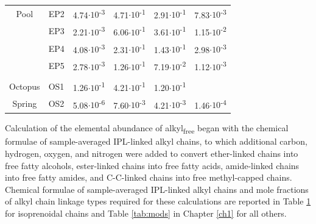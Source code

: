 {\begin{table}
\begin{threeparttable}
\begin{tabular}{clllcc}
Pool  & EP2   & 4.74$\cdot 10$\textsuperscript{-3} & 4.71$\cdot 10$\textsuperscript{-1} & 2.91$\cdot 10$\textsuperscript{-1} & 7.83$\cdot 10$\textsuperscript{-3} \\
      & EP3   & 2.21$\cdot 10$\textsuperscript{-3} & 6.06$\cdot 10$\textsuperscript{-1} & 3.61$\cdot 10$\textsuperscript{-1} & 1.15$\cdot 10$\textsuperscript{-2} \\
      & EP4   & 4.08$\cdot 10$\textsuperscript{-3} & 2.31$\cdot 10$\textsuperscript{-1} & 1.43$\cdot 10$\textsuperscript{-1} & 2.98$\cdot 10$\textsuperscript{-3} \\
      & EP5   & 2.78$\cdot 10$\textsuperscript{-3} & 1.26$\cdot 10$\textsuperscript{-1} & 7.19$\cdot 10$\textsuperscript{-2} & 1.12$\cdot 10$\textsuperscript{-3} \\
      &       &       &       &       &  \\
Octopus & OS1   & 1.26$\cdot 10$\textsuperscript{-1} & 4.21$\cdot 10$\textsuperscript{-1} & 1.20$\cdot 10$\textsuperscript{-1} &  \\
Spring & OS2   & 5.08$\cdot 10$\textsuperscript{-6} & 7.60$\cdot 10$\textsuperscript{-3} & 4.21$\cdot 10$\textsuperscript{-3} & 1.46$\cdot 10$\textsuperscript{-4} \\
\bottomrule
\end{tabular}%
  
  \begin{tablenotes}
    \item
        
  \end{tablenotes}
  
  \label{tab:leftover_props}
  \end{threeparttable}
\end{table}
\setcounter{tabcounter}{0} %
\doublespace
\clearpage
}

Calculation of the elemental abundance of alkyl\textsubscript{free} began with the chemical formulae of sample-averaged IPL-linked alkyl chains, to which additional carbon, hydrogen, oxygen, and nitrogen were added to convert ether-linked chains into free fatty alcohols, ester-linked chains into free fatty acids, amide-linked chains into free fatty amides, and C-C-linked chains into free methyl-capped chains. Chemical formulae of sample-averaged IPL-linked alkyl chains and mole fractions of alkyl chain linkage types required for these calculations are reported in Table \ref{tab:leftover_props} for isoprenoidal chains and Table \ref{tab:mods} in Chapter \ref{ch1} for all others.

